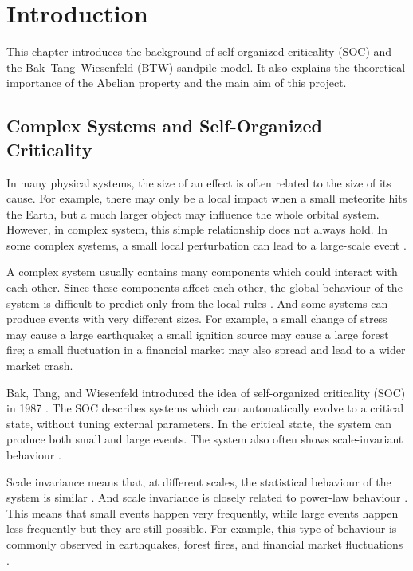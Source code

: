 \chapter{Introduction}

This chapter introduces the background of self-organized criticality (SOC) and the Bak--Tang--Wiesenfeld (BTW) sandpile model. It also explains the theoretical importance of the Abelian property and the main aim of this project. 

\section{Complex Systems and Self-Organized Criticality}

In many physical systems, the size of an effect is often related to the size of its cause. For example, there may only be a local impact when a small meteorite hits the Earth, but a much larger object may influence the whole orbital system. However, in complex system, this simple relationship does not always hold. In some complex systems, a small local perturbation can lead to a large-scale event \citep{Ladyman2013}.

A complex system usually contains many components which could interact with each other. Since these components affect each other, the global behaviour of the system is difficult to predict only from the local rules \citep{Ladyman2013}. And some systems can produce events with very different sizes. For example, a small change of stress may cause a large earthquake; a small ignition source may cause a large forest fire; a small fluctuation in a financial market may also spread and lead to a wider market crash. 

Bak, Tang, and Wiesenfeld introduced the idea of self-organized criticality (SOC) in 1987 \citep{Bak1987}. The SOC describes systems which can automatically evolve to a critical state, without tuning external parameters. In the critical state, the system can produce both small and large events. The system also often shows scale-invariant behaviour \citep{TADIC2023}. 

Scale invariance means that, at different scales, the statistical behaviour of the system is similar \citep{TADIC2023}. And scale invariance is closely related to power-law behaviour \citep{Aschwanden2025}. This means that small events happen very frequently, while large events happen less frequently but they are still possible. For example, this type of behaviour is commonly observed in earthquakes, forest fires, and financial market fluctuations \citep{Aschwanden2025} \citep{TADIC2023}. 

